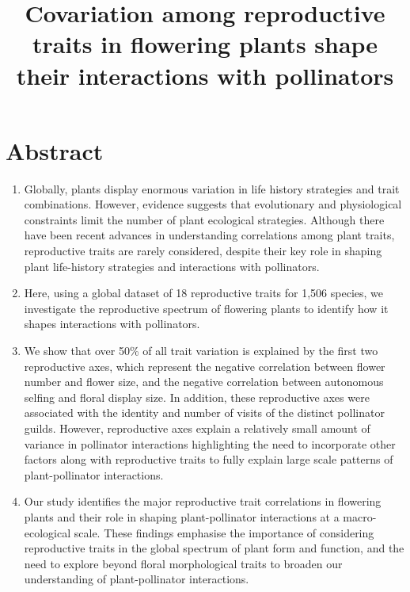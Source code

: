 \documentclass[
  12pt,
  a4paper,
]{article}
\title{\singlespacing \vspace{-1.6cm} \LARGE Covariation among reproductive traits in flowering plants shape their interactions with pollinators}
\author{}
\date{\vspace{-2.5em}}
\begin{document}
\maketitle

\doublespacing
\normalsize

\hypertarget{abstract}{%
\section{Abstract}\label{abstract}}

\begin{enumerate}
\def\labelenumi{\arabic{enumi}.}
\item
  Globally, plants display enormous variation in life history strategies and trait combinations. However, evidence suggests that evolutionary and physiological constraints limit the number of plant ecological strategies. Although there have been recent advances in understanding correlations among plant traits, reproductive traits are rarely considered, despite their key role in shaping plant life-history strategies and interactions with pollinators.
\item
  Here, using a global dataset of 18 reproductive traits for 1,506 species, we investigate the reproductive spectrum of flowering plants to identify how it shapes interactions with pollinators.
\item
  We show that over 50\% of all trait variation is explained by the first two reproductive axes, which represent the negative correlation between flower number and flower size, and the negative correlation between autonomous selfing and floral display size. In addition, these reproductive axes were associated with the identity and number of visits of the distinct pollinator guilds. However, reproductive axes explain a relatively small amount of variance in pollinator interactions highlighting the need to incorporate other factors along with reproductive traits to fully explain large scale patterns of plant-pollinator interactions.
\item
  Our study identifies the major reproductive trait correlations in flowering plants and their role in shaping plant-pollinator interactions at a macro-ecological scale. These findings emphasise the importance of considering reproductive traits in the global spectrum of plant form and function, and the need to explore beyond floral morphological traits to broaden our understanding of plant-pollinator interactions.
\end{enumerate}
\end{document}
